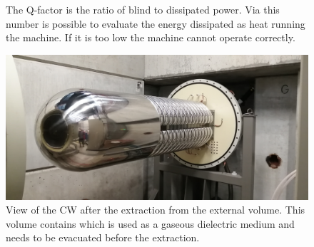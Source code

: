 \begin{refsection}
        \begin{figure}[ht]   
            \centering
            \hfill
            \caption[CW: Q-factor measurement]{The Q-factor is the ratio of blind to dissipated power. Via this number is possible to evaluate the energy dissipated as heat running the machine. If it is too low the machine cannot operate correctly.}
        \end{figure}

        \begin{figure}
            \centering
            \includegraphics[width=1\textwidth]{Figures/MEG/CW/view_front.jpg}
            \caption[CW: picture]{View of the CW after the extraction from the external volume. This volume contains  which is used as a gaseous dielectric medium and needs to be evacuated before the extraction.}
            \label{fig:CW:view}
        \end{figure}


\end{refsection}

